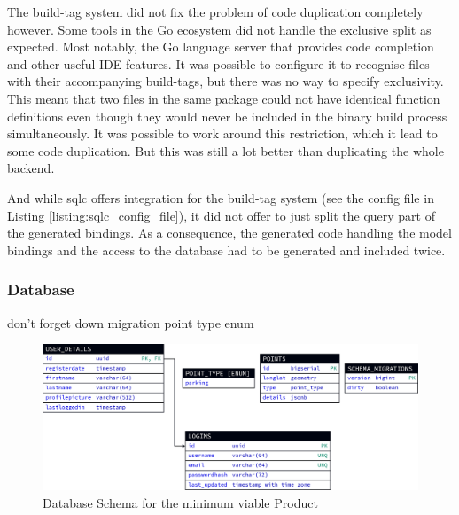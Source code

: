 The build-tag system did not fix the problem of code duplication completely
however. Some tools in the Go ecosystem did not handle the exclusive split as
expected. Most notably, the Go language server that provides code completion and
other useful IDE features. It was possible to configure it to recognise files
with their accompanying build-tags, but there was no way to specify exclusivity.
This meant that two files in the same package could not have identical function
definitions even though they would never be included in the binary build process
simultaneously. It was possible to work around this restriction, which it lead
to some code duplication. But this was still a lot better than duplicating the
whole backend.

And while sqlc offers integration for the build-tag system (see the config file
in Listing \ref{listing:sqlc_config_file}), it did not offer to just split the
query part of the generated bindings. As a consequence, the generated code
handling the model bindings and the access to the database had to be generated
and included twice.

\subsubsection{Database}
don't forget down migration point type enum

\begin{figure}[htbp]
  \centering{}
  \includegraphics[width=\textwidth]{../d2-diagrams/database-init/database-init.png}
  \caption{Database Schema for the minimum viable Product}
  \label{fig:database_init_schema}
\end{figure}

